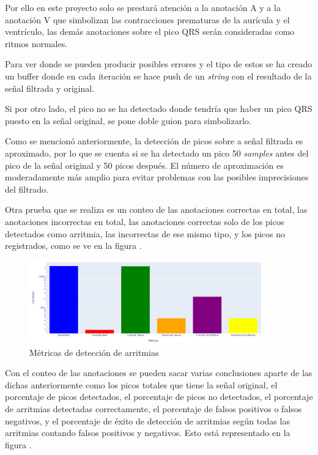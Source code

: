 Por ello en este proyecto solo se prestará atención a la anotación A y a la anotación V que simbolizan 
las contracciones prematuras de la aurícula y el ventrículo, las demás anotaciones sobre el pico QRS serán 
consideradas como ritmos normales.

Para ver donde se pueden producir posibles errores y el tipo de estos se ha creado un buffer donde en 
cada iteración se hace push de un \textit{string} con el resultado de la señal filtrada y original.

Si por otro lado, el pico no se ha detectado donde tendría que haber un pico QRS puesto en la señal original, 
se pone doble guion para simbolizarlo.

Como se mencionó anteriormente, la detección de picos sobre a señal filtrada es aproximado, por lo que se cuenta
si se ha detectado un pico 50 \textit{samples} antes del pico de la señal original y 50 picos después. El número de aproximación 
es moderadamente más amplio para evitar problemas con las posibles imprecisiones del filtrado.  

Otra prueba que se realiza es un conteo de las anotaciones correctas en total, las anotaciones incorrectas en total, las anotaciones
correctas solo de los picos detectados como arritmia, las incorrectas de ese mismo tipo, y los picos no registrados, 
como se ve en la figura .

\begin{figure}[h!]
	\centering
    \includegraphics[width=0.9\textwidth]{./Images/img_algoritmo/estadisticas_arritmias_1.png}
    \caption{Métricas de detección de arritmias}
    \label{fig:estadisticas_algoritmos_1}
\end{figure} 

Con el conteo de las anotaciones se pueden sacar varias conclusiones aparte de las dichas 
anteriormente como los picos totales que tiene la señal original, el porcentaje de picos 
detectados, el porcentaje de picos no detectados, el porcentaje de arritmias detectadas 
correctamente, el porcentaje de falsos positivos o falsos negativos, y el porcentaje de éxito de detección de 
arritmias según todas las arritmias contando falsos positivos y negativos. Esto está representado en la figura .

